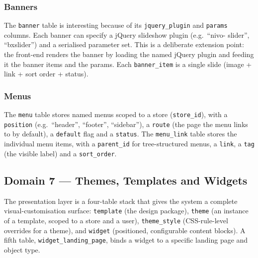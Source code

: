 \documentclass[11pt,a4paper]{article}
\begin{document}
\subsubsection{Banners}

The \texttt{banner} table is interesting because of its
\texttt{jquery\_plugin} and \texttt{params} columns. Each
banner can specify a jQuery slideshow plugin (e.g.\ ``nivo-
slider'', ``bxslider'') and a serialised parameter set.
This is a deliberate extension point: the front-end renders
the banner by loading the named jQuery plugin and feeding it
the banner items and the params. Each \texttt{banner\_item}
is a single slide (image + link + sort order + status).

\subsubsection{Menus}

The \texttt{menu} table stores named menus scoped to a store
(\texttt{store\_id}), with a \texttt{position} (e.g.\
``header'', ``footer'', ``sidebar''), a \texttt{route}
(the page the menu links to by default), a \texttt{default}
flag and a \texttt{status}. The \texttt{menu\_link} table
stores the individual menu items, with a \texttt{parent\_id}
for tree-structured menus, a \texttt{link}, a \texttt{tag}
(the visible label) and a \texttt{sort\_order}.

\subsection{Domain 7 --- Themes, Templates and Widgets}\label{sec:themes}

The presentation layer is a four-table stack that gives the
system a complete visual-customisation surface:
\texttt{template} (the design package),
\texttt{theme} (an instance of a template, scoped to a store
and a user), \texttt{theme\_style} (CSS-rule-level overrides
for a theme), and \texttt{widget} (positioned, configurable
content blocks). A fifth table, \texttt{widget\_landing\_page},
binds a widget to a specific landing page and object type.
\end{document}
